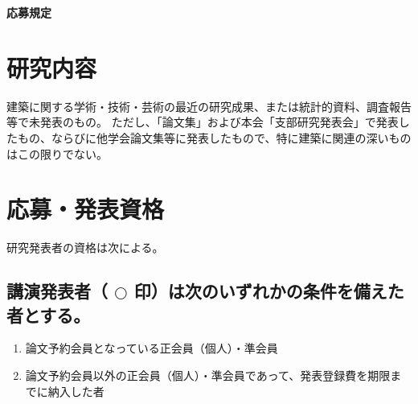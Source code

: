 \documentclass[base=10pt,magstyle=real,a4paper,twocolumn,xelatex,pandoc,jafont=ms]{bxjsarticle}
\begin{document}

\textbf{応募規定}
\section{研究内容}
	建築に関する学術・技術・芸術の最近の研究成果、または統計的資料、調査報告等で未発表のもの。
	ただし、「論文集」および本会「支部研究発表会」で発表したもの、ならびに他学会論文集等に発表したもので、特に建築に関連の深いものはこの限りでない。

\section{応募・発表資格}
	研究発表者の資格は次による。
	\subsection{講演発表者（ $\bigcirc$ 印）は次のいずれかの条件を備えた者とする。}
		\begin{enumerate}
			\item 論文予約会員となっている正会員（個人）・準会員
			\item 論文予約会員以外の正会員（個人）・準会員であって、発表登録費を期限までに納入した者
		\end{enumerate}
\end{document}
